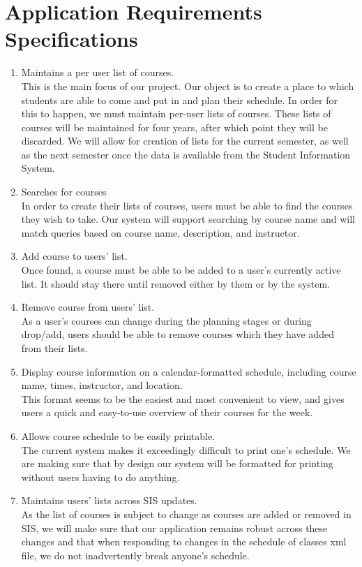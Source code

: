 \documentclass[pdftex,12pt,letter]{article}
\begin{document}
\section*{Application Requirements Specifications}
\begin{enumerate}[1.]
\item Maintains a per user list of courses.\\
This is the main focus of our project. Our object is to create a place to which students are able to come and put in and plan their schedule. In order for this to happen, we must maintain per-user lists of courses. These lists of courses will be maintained for four years, after which point they will be discarded. We will allow for creation of lists for the current semester, as well as the next semester once the data is available from the Student Information System.
\item Searches for courses\\
In order to create their lists of courses, users must be able to find the courses they wish to take. Our system will support searching by course name and will match queries based on course name, description, and instructor.
\item Add course to users' list.\\
Once found, a course must be able to be added to a user's currently active list. It should stay there until removed either by them or by the system.
\item Remove course from users' list.\\
As a user's courses can change during the planning stages or during drop/add, users should be able to remove courses which they have added from their lists.
\item Display course information on a calendar-formatted schedule, including course name, times, instructor, and location.\\
This format seems to be the easiest and most convenient to view, and gives users a quick and easy-to-use overview of their courses for the week.
\item Allows course schedule to be easily printable.\\
The current system makes it exceedingly difficult to print one's schedule. We are making sure that by design our system will be formatted for printing without users having to do anything.
\item Maintains users' lists across SIS updates.\\
As the list of courses is subject to change as courses are added or removed in SIS, we will make sure that our application remains robust across these changes and that when responding to changes in the schedule of classes xml file, we do not inadvertently break anyone's schedule.

\end{enumerate}
\end{document}
